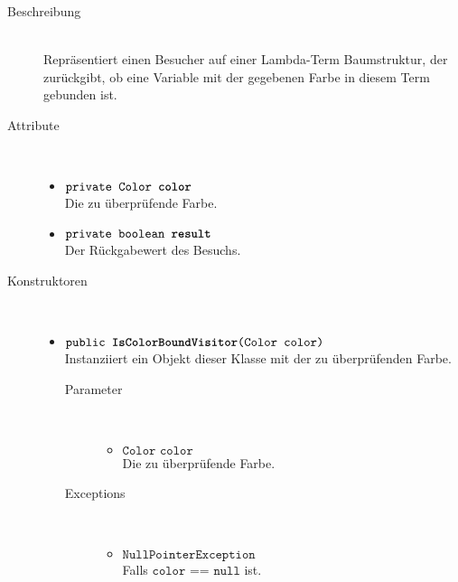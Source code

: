 \begin{description}
\item[Beschreibung] \hfill \\ Repräsentiert einen Besucher auf einer Lambda-Term Baumstruktur, der zurückgibt, ob eine Variable mit der gegebenen Farbe in diesem Term gebunden ist.

\item[Attribute] \hfill \\
	\vspace{-.8cm}
	\begin{itemize}
		\item $\texttt{private Color \textbf{color}}$ \\ Die zu überprüfende Farbe.
		\item $\texttt{private boolean \textbf{result}}$ \\ Der Rückgabewert des Besuchs.
	\end{itemize}

\item[Konstruktoren] \hfill \\
	\vspace{-.8cm}
	\begin{itemize}
		\item $\texttt{public \textbf{IsColorBoundVisitor}(Color color)}$ \\ Instanziiert ein Objekt dieser Klasse mit der zu überprüfenden Farbe.
		\begin{description}
			\item[Parameter] \hfill \\
			\vspace{-.8cm}
			\begin{itemize}
				\item $\texttt{Color color}$ \\ Die zu überprüfende Farbe.
			\end{itemize}
			\item[Exceptions] \hfill \\
			\vspace{-.8cm}
			\begin{itemize}
				\item $\texttt{NullPointerException}$ \\ Falls $\texttt{color == null}$ ist.
			\end{itemize}
		\end{description}
	\end{itemize}


\end{description}
